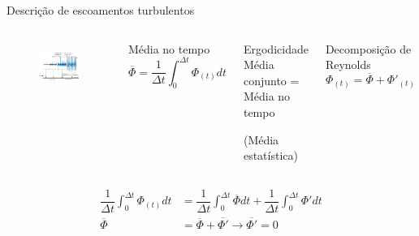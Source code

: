\documentclass[10pt]{beamer}
\newcommand{\m}[1]{\overline{#1}}
\begin{document}
\begin{frame}[fragile]{Descrição de escoamentos turbulentos}
	\begin{columns}
		\begin{figure}
			\centering
			\includegraphics[width=0.8\linewidth]{velFluct}
			\label{fig:velFluct}
		\end{figure}
	\begin{block}{Média no tempo}
		\begin{equation*}
		\m{\Phi} = \dfrac{1}{\Delta t} \int_{0}^{\Delta t} \Phi_{(t)} dt
		\end{equation*}
	\end{block}
	
		\begin{block}{Ergodicidade}
			\centering
			Média conjunto = Média no tempo
			
			(Média estatística)
		\end{block}
	
		\begin{block}{Decomposição de Reynolds}
			\begin{equation*}
			\Phi_{(t)} = \m{\Phi} + \Phi'_{(t)}
			\end{equation*}
		\end{block}
	\end{columns}
	
	\begin{align*}
	\dfrac{1}{\Delta t} \int_{0}^{\Delta t} \Phi_{(t)} dt
	&= \dfrac{1}{\Delta t} \int_{0}^{\Delta t} \m{\Phi} dt
	+ \dfrac{1}{\Delta t} \int_{0}^{\Delta t} \Phi' dt \\
	\m{\Phi} &= \m{\Phi} + \m{\Phi'} \rightarrow \boxed{\m{\Phi'} = 0}
	\end{align*}

\end{frame}
\end{document}
